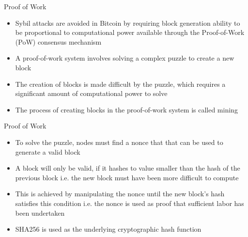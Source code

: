 \documentclass[9pt]{beamer}
\begin{document}

\begin{frame}{Proof of Work}
	\begin{itemize}
		\item Sybil attacks are avoided in Bitcoin by requiring block generation ability to be proportional to computational power available through the Proof-of-Work (PoW) consensus mechanism
		\item A proof-of-work system involves solving a complex puzzle to create a new block
		\item The creation of blocks is made difficult by the puzzle, which requires a significant amount of computational power to solve
		\item The process of creating blocks in the proof-of-work system is called mining
	\end{itemize}
\end{frame}

\begin{frame}{Proof of Work}
	\begin{itemize}
		\item To solve the puzzle, nodes must find a nonce that that can be used to generate a valid block
		\item A block will only be valid, if it hashes to value smaller than the hash of the previous block i.e. the new block must have been more difficult to compute
		\item This is achieved by manipulating the nonce until the new block's hash satisfies this condition i.e. the nonce is used as proof that sufficient labor has been undertaken
		\item SHA256 is used as the underlying cryptographic hash function
		\end{itemize}
\end{frame}

\end{document}
